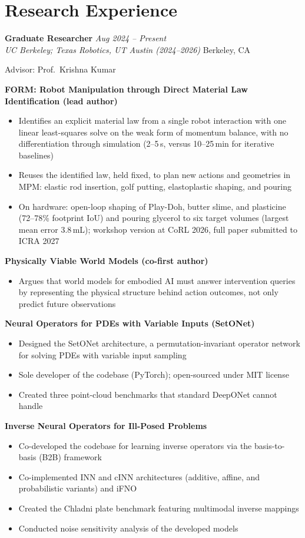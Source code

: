 \documentclass[11pt,letterpaper]{article}
\newcommand{\entryhead}[4]{%
    \textbf{#1} \hfill \textit{#2} \\
    \textit{#3} \hfill #4 \par
}
\newcommand{\projecthead}[1]{%
    \vspace{5pt}\textbf{#1}\par\vspace{2pt}
}
\begin{document}
\section{Research Experience}

\entryhead{Graduate Researcher}{Aug 2024 -- Present}
{UC Berkeley; Texas Robotics, UT Austin (2024--2026)}{Berkeley, CA}
Advisor: Prof.\ Krishna Kumar

\projecthead{FORM: Robot Manipulation through Direct Material Law Identification (lead author)}
\begin{itemize}
    \item Identifies an explicit material law from a single robot interaction with one linear least-squares solve on the weak form of momentum balance, with no differentiation through simulation (2--5\,s, versus 10--25\,min for iterative baselines)
    \item Reuses the identified law, held fixed, to plan new actions and geometries in MPM: elastic rod insertion, golf putting, elastoplastic shaping, and pouring
    \item On hardware: open-loop shaping of Play-Doh, butter slime, and plasticine (72--78\% footprint IoU) and pouring glycerol to six target volumes (largest mean error 3.8\,mL); workshop version at CoRL 2026, full paper submitted to ICRA 2027
\end{itemize}

\projecthead{Physically Viable World Models (co-first author)}
\begin{itemize}
    \item Argues that world models for embodied AI must answer intervention queries by representing the physical structure behind action outcomes, not only predict future observations
\end{itemize}

\projecthead{Neural Operators for PDEs with Variable Inputs (SetONet)}
\begin{itemize}
    \item Designed the SetONet architecture, a permutation-invariant operator network for solving PDEs with variable input sampling
    \item Sole developer of the codebase (PyTorch); open-sourced under MIT license
    \item Created three point-cloud benchmarks that standard DeepONet cannot handle
\end{itemize}

\projecthead{Inverse Neural Operators for Ill-Posed Problems}
\begin{itemize}
    \item Co-developed the codebase for learning inverse operators via the basis-to-basis (B2B) framework
    \item Co-implemented INN and cINN architectures (additive, affine, and probabilistic variants) and iFNO
    \item Created the Chladni plate benchmark featuring multimodal inverse mappings
    \item Conducted noise sensitivity analysis of the developed models
\end{itemize}
\end{document}
